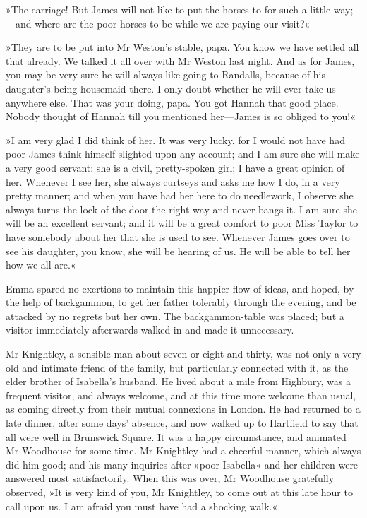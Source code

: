 »The carriage! But James will not like to put the horses to for such a little way;—and where are the poor horses to be while we are paying our visit?«

»They are to be put into Mr Weston's stable, papa. You know we have settled all that already. We talked it all over with Mr Weston last night. And as for James, you may be very sure he will always like going to Randalls, because of his daughter's being housemaid there. I only doubt whether he will ever take us anywhere else. That was your doing, papa. You got Hannah that good place. Nobody thought of Hannah till you mentioned her—James is so obliged to you!«

»I am very glad I did think of her. It was very lucky, for I would not have had poor James think himself slighted upon any account; and I am sure she will make a very good servant: she is a civil, pretty-spoken girl; I have a great opinion of her. Whenever I see her, she always curtseys and asks me how I do, in a very pretty manner; and when you have had her here to do needlework, I observe she always turns the lock of the door the right way and never bangs it. I am sure she will be an excellent servant; and it will be a great comfort to poor Miss Taylor to have somebody about her that she is used to see. Whenever James goes over to see his daughter, you know, she will be hearing of us. He will be able to tell her how we all are.«

Emma spared no exertions to maintain this happier flow of ideas, and hoped, by the help of backgammon, to get her father tolerably through the evening, and be attacked by no regrets but her own. The backgammon-table was placed; but a visitor immediately afterwards walked in and made it unnecessary.

Mr Knightley, a sensible man about seven or eight-and-thirty, was not only a very old and intimate friend of the family, but particularly connected with it, as the elder brother of Isabella's husband. He lived about a mile from Highbury, was a frequent visitor, and always welcome, and at this time more welcome than usual, as coming directly from their mutual connexions in London. He had returned to a late dinner, after some days' absence, and now walked up to Hartfield to say that all were well in Brunswick Square. It was a happy circumstance, and animated Mr Woodhouse for some time. Mr Knightley had a cheerful manner, which always did him good; and his many inquiries after »poor Isabella« and her children were answered most satisfactorily. When this was over, Mr Woodhouse gratefully observed, »It is very kind of you, Mr Knightley, to come out at this late hour to call upon us. I am afraid you must have had a shocking walk.«


